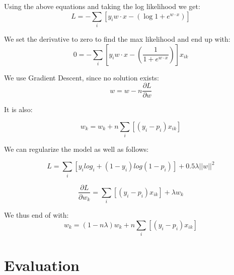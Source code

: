 Using the above equations and taking the log likelihood we get:
\begin{equation}
L= -\sum_i[y_iw\cdot x -(\log{1 + e^{w \cdot x}})]
\end{equation}

We set the derivative to zero to find the max likelihood and end up with:
\begin{equation}
0 = -\sum_i[y_iw\cdot x -(\frac{1}{1 + e^{w \cdot x}})]x_{ik}
\end{equation}

We use Gradient Descent, since no solution exists:
\begin{equation}
w = w - n\frac{\partial L}{\partial w}
\end{equation}

It is also:

\begin{equation}
w_k  = w_k + n\sum_i[(y_i - p_i)x_{ik}]
\end{equation}

We can regularize the model as well as follows:

\begin{equation}
L = \sum_i [y_i log _i+(1-y_i)log(1-p_i)]+0.5\lambda{}||w||^{2}
\end{equation}

\begin{equation}
\frac{\partial L}{\partial w_k}=\sum_i[(y_i-p_i)x_{ik}]+\lambda{}w_k 
\end{equation}

We thus end of with: 
\begin{equation}
w_k = (1 - n\lambda{})w_k + n \sum_i[(y_i-p_i)x_{ik}]
\end{equation}


\section{Evaluation}

